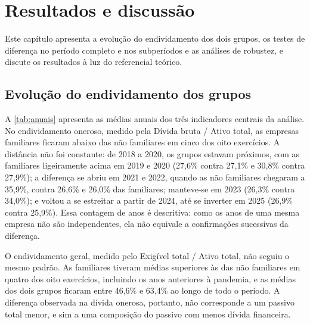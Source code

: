 \chapter{Resultados e discussão}\label{cap:resultados}

Este capítulo apresenta a evolução do endividamento dos dois grupos, os testes de
diferença no período completo e nos subperíodos e as análises de robustez, e
discute os resultados à luz do referencial teórico.

\section{Evolução do endividamento dos grupos}\label{sec:evolucao}

A \autoref{tab:anuais} apresenta as médias anuais dos três indicadores centrais da
análise. No endividamento oneroso, medido pela Dívida bruta / Ativo total, as
empresas familiares ficaram abaixo das não familiares em cinco dos oito
exercícios. A distância não foi constante: de 2018 a 2020, os grupos estavam
próximos, com as familiares ligeiramente acima em 2019 e 2020 (27,6\% contra 27,1\%
e 30,8\% contra 27,9\%); a diferença se abriu em 2021 e 2022, quando as não
familiares chegaram a 35,9\%, contra 26,6\% e 26,0\% das familiares; manteve-se em
2023 (26,3\% contra 34,0\%); e voltou a se estreitar a partir de 2024, até se
inverter em 2025 (26,9\% contra 25,9\%). Essa contagem de anos é descritiva: como os
anos de uma mesma empresa não são independentes, ela não equivale a confirmações
sucessivas da diferença.



O endividamento geral, medido pelo Exigível total / Ativo total, não seguiu o
mesmo padrão. As familiares tiveram médias superiores às das não familiares em
quatro dos oito exercícios, incluindo os anos anteriores à pandemia, e as médias
dos dois grupos ficaram entre 46,6\% e 63,4\% ao longo de todo o período. A
diferença observada na dívida onerosa, portanto, não corresponde a um passivo
total menor, e sim a uma composição do passivo com menos dívida financeira.

